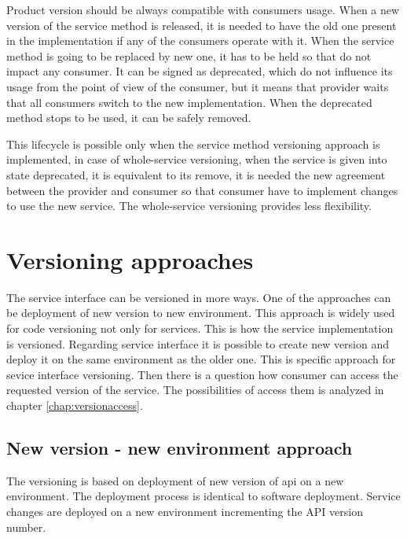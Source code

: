 Product version should be always compatible with consumers usage. When a new version of the service method is released, it is needed to have the old one present in the implementation if any of the consumers operate with it. When the service method is going to be replaced by new one, it has to be held so that do not impact any consumer. It can be signed as deprecated, which do not influence its usage from the point of view of the consumer, but it means that provider waits that all consumers switch to the new implementation. When the deprecated method stops to be used, it can be safely removed. 

This lifecycle is possible only when the service method versioning approach is implemented, in case of whole-service versioning, when the service is given into state deprecated, it is equivalent to its remove, it is needed the new agreement between the provider and consumer so that consumer have to implement changes to use the new service. %
The whole-service versioning provides less flexibility.


\section{Versioning approaches}
\label{sec:versioning-approaches}

The service interface can be versioned in more ways. One of the approaches can be deployment of new version to new environment. This approach is widely used for code versioning not only for services. This is how the service implementation is versioned. Regarding service interface it is possible to create new version and deploy it on the same environment as the older one. This is specific approach for sevice interface versioning. Then there is a question how consumer can access the requested version of the service. The possibilities of access them is analyzed in chapter \ref{chap:versionaccess}.


\subsection{New version - new environment approach}

The versioning is based on deployment of new version of \gls{api} on a new environment. The deployment process is identical to software deployment. Service changes are deployed on a new environment incrementing the API version number.

